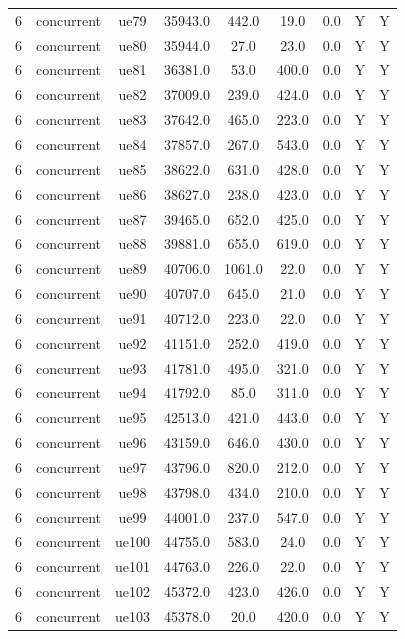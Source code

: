 \begin{table}[ht]
\begin{tabular}{|c|c|c|c|c|c|c|c|c|}
6 & concurrent & ue79 & 35943.0 & 442.0 & 19.0 & 0.0 & Y & Y \\
6 & concurrent & ue80 & 35944.0 & 27.0 & 23.0 & 0.0 & Y & Y \\
6 & concurrent & ue81 & 36381.0 & 53.0 & 400.0 & 0.0 & Y & Y \\
6 & concurrent & ue82 & 37009.0 & 239.0 & 424.0 & 0.0 & Y & Y \\
6 & concurrent & ue83 & 37642.0 & 465.0 & 223.0 & 0.0 & Y & Y \\
6 & concurrent & ue84 & 37857.0 & 267.0 & 543.0 & 0.0 & Y & Y \\
6 & concurrent & ue85 & 38622.0 & 631.0 & 428.0 & 0.0 & Y & Y \\
6 & concurrent & ue86 & 38627.0 & 238.0 & 423.0 & 0.0 & Y & Y \\
6 & concurrent & ue87 & 39465.0 & 652.0 & 425.0 & 0.0 & Y & Y \\
6 & concurrent & ue88 & 39881.0 & 655.0 & 619.0 & 0.0 & Y & Y \\
6 & concurrent & ue89 & 40706.0 & 1061.0 & 22.0 & 0.0 & Y & Y \\
6 & concurrent & ue90 & 40707.0 & 645.0 & 21.0 & 0.0 & Y & Y \\
6 & concurrent & ue91 & 40712.0 & 223.0 & 22.0 & 0.0 & Y & Y \\
6 & concurrent & ue92 & 41151.0 & 252.0 & 419.0 & 0.0 & Y & Y \\
6 & concurrent & ue93 & 41781.0 & 495.0 & 321.0 & 0.0 & Y & Y \\
6 & concurrent & ue94 & 41792.0 & 85.0 & 311.0 & 0.0 & Y & Y \\
6 & concurrent & ue95 & 42513.0 & 421.0 & 443.0 & 0.0 & Y & Y \\
6 & concurrent & ue96 & 43159.0 & 646.0 & 430.0 & 0.0 & Y & Y \\
6 & concurrent & ue97 & 43796.0 & 820.0 & 212.0 & 0.0 & Y & Y \\
6 & concurrent & ue98 & 43798.0 & 434.0 & 210.0 & 0.0 & Y & Y \\
6 & concurrent & ue99 & 44001.0 & 237.0 & 547.0 & 0.0 & Y & Y \\
6 & concurrent & ue100 & 44755.0 & 583.0 & 24.0 & 0.0 & Y & Y \\
6 & concurrent & ue101 & 44763.0 & 226.0 & 22.0 & 0.0 & Y & Y \\
6 & concurrent & ue102 & 45372.0 & 423.0 & 426.0 & 0.0 & Y & Y \\
6 & concurrent & ue103 & 45378.0 & 20.0 & 420.0 & 0.0 & Y & Y \\

\end{tabular}
\end{table}
